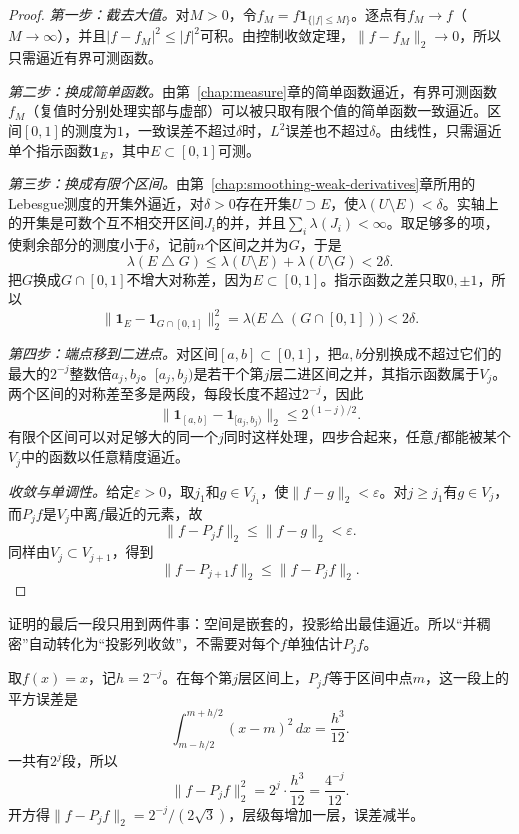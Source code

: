 \begin{proof}
\emph{第一步：截去大值。}对$M>0$，令$f_M=f\mathbf{1}_{\{\lvert f\rvert\leq M\}}$。逐点有$f_M\to f$（$M\to\infty$），并且$\lvert f-f_M\rvert^2\leq\lvert f\rvert^2$可积。由控制收敛定理，$\lVert f-f_M\rVert_2\to0$，所以只需逼近有界可测函数。

\emph{第二步：换成简单函数。}由第~\ref{chap:measure}章的简单函数逼近，有界可测函数$f_M$（复值时分别处理实部与虚部）可以被只取有限个值的简单函数一致逼近。区间$[0,1]$的测度为$1$，一致误差不超过$\delta$时，$L^2$误差也不超过$\delta$。由线性，只需逼近单个指示函数$\mathbf{1}_E$，其中$E\subset[0,1]$可测。

\emph{第三步：换成有限个区间。}由第~\ref{chap:smoothing-weak-derivatives}章所用的Lebesgue测度的开集外逼近，对$\delta>0$存在开集$U\supset E$，使$\lambda(U\setminus E)<\delta$。实轴上的开集是可数个互不相交开区间$J_i$的并，并且$\sum_i\lambda(J_i)<\infty$。取足够多的项，使剩余部分的测度小于$\delta$，记前$n$个区间之并为$G$，于是
\[
 \lambda(E\mathbin{\triangle}G)\leq\lambda(U\setminus E)+\lambda(U\setminus G)<2\delta.
\]
把$G$换成$G\cap[0,1]$不增大对称差，因为$E\subset[0,1]$。指示函数之差只取$0,\pm1$，所以
\[
 \lVert\mathbf{1}_E-\mathbf{1}_{G\cap[0,1]}\rVert_2^2
 =\lambda\bigl(E\mathbin{\triangle}(G\cap[0,1])\bigr)<2\delta.
\]

\emph{第四步：端点移到二进点。}对区间$[a,b]\subset[0,1]$，把$a,b$分别换成不超过它们的最大的$2^{-j}$整数倍$a_j,b_j$。$[a_j,b_j)$是若干个第$j$层二进区间之并，其指示函数属于$V_j$。两个区间的对称差至多是两段，每段长度不超过$2^{-j}$，因此
\[
 \lVert\mathbf{1}_{[a,b]}-\mathbf{1}_{[a_j,b_j)}\rVert_2\leq2^{(1-j)/2}.
\]
有限个区间可以对足够大的同一个$j$同时这样处理，四步合起来，任意$f$都能被某个$V_j$中的函数以任意精度逼近。

\emph{收敛与单调性。}给定$\varepsilon>0$，取$j_1$和$g\in V_{j_1}$，使$\lVert f-g\rVert_2<\varepsilon$。对$j\geq j_1$有$g\in V_j$，而$P_jf$是$V_j$中离$f$最近的元素，故
\[
 \lVert f-P_jf\rVert_2\leq\lVert f-g\rVert_2<\varepsilon.
\]
同样由$V_j\subset V_{j+1}$，得到
\[
 \lVert f-P_{j+1}f\rVert_2\leq\lVert f-P_jf\rVert_2.
\]
\end{proof}

证明的最后一段只用到两件事：空间是嵌套的，投影给出最佳逼近。所以“并稠密”自动转化为“投影列收敛”，不需要对每个$f$单独估计$P_jf$。

\begin{example}[线性函数的投影误差]
\label{ex:wavelet-linear-projection-error}
取$f(x)=x$，记$h=2^{-j}$。在每个第$j$层区间上，$P_jf$等于区间中点$m$，这一段上的平方误差是
\[
 \int_{m-h/2}^{m+h/2}(x-m)^2\,dx=\frac{h^3}{12}.
\]
一共有$2^j$段，所以
\[
 \lVert f-P_jf\rVert_2^2=2^j\cdot\frac{h^3}{12}=\frac{4^{-j}}{12}.
\]
开方得$\lVert f-P_jf\rVert_2=2^{-j}/(2\sqrt3)$，层级每增加一层，误差减半。
\end{example}

